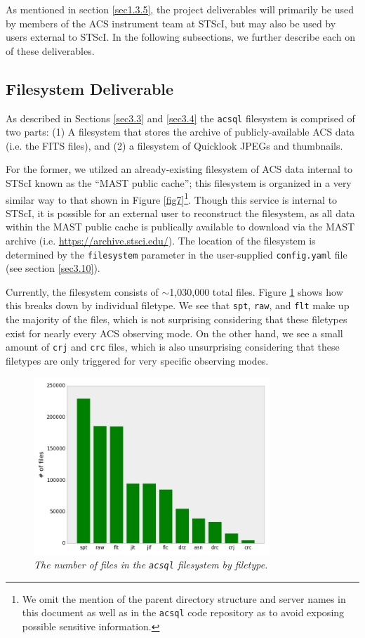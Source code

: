 \documentclass[10pt,journal,compsoc]{IEEEtran}
\begin{document}
As mentioned in section \ref{sec1.3.5}, the project deliverables will primarily be used by members of the ACS instrument team at STScI, but may also be used by users external to STScI.
In the following subsections, we further describe each on of these deliverables.


\subsection{Filesystem Deliverable} \label{sec4.1}

As described in Sections \ref{sec3.3} and \ref{sec3.4} the \texttt{acsql} filesystem is comprised of two parts: (1) A filesystem that stores the archive of publicly-available ACS data (i.e. the
FITS files), and (2) a filesystem of Quicklook JPEGs and thumbnails.

For the former, we utilzed an already-existing filesystem of ACS data internal to STScI known as the ``MAST public cache''; this filesystem is organized in a very similar way to that shown in
Figure \ref{fig7}\footnote{We omit the mention of the parent directory structure and server names in this document as well as in the \texttt{acsql} code repository as to avoid exposing possible
sensitive information.}.  Though this service is internal to STScI, it is possible for an external user to reconstruct the filesystem, as all data within the MAST public cache is publically available
to download via the MAST archive (i.e. \textcolor{blue}{\url{https://archive.stsci.edu/}}).  The location of the filesystem is determined by the \texttt{filesystem} parameter in the user-supplied
\texttt{config.yaml} file (see section \ref{sec3.10}).

Currently, the filesystem consists of $\sim$1,030,000 total files. Figure \ref{fig29} shows how this breaks down by individual filetype.  We see that \texttt{spt}, \texttt{raw}, and \texttt{flt}
make up the majority of the files, which is not surprising considering that these filetypes exist for nearly every ACS observing mode.  On the other hand, we see a small amount of \texttt{crj} and
\texttt{crc} files, which is also unsurprising considering that these filetypes are only triggered for very specific observing modes.

\begin{figure}[!h]
\centering
\includegraphics[width=3.5in]{./figures/num_files_by_filetype.png}
\caption{\textit{The number of files in the \texttt{acsql} filesystem by filetype.}}
\label{fig29}
\end{figure}
\end{document}
